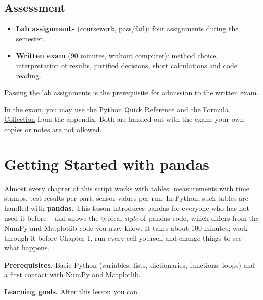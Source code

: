 \documentclass[
  letterpaper,
  DIV=11,
  numbers=noendperiod]{scrreprt}
\providecommand{\tightlist}{%
  \setlength{\itemsep}{0pt}\setlength{\parskip}{0pt}}\usepackage{longtable,booktabs,array}
\begin{document}
\section*{Assessment}\label{assessment}


\begin{itemize}
\tightlist
\item
  \textbf{Lab assignments} (coursework, pass/fail): four assignments
  during the semester.
\item
  \textbf{Written exam} (90 minutes, without computer): method choice,
  interpretation of results, justified decisions, short calculations and
  code reading.
\end{itemize}

Passing the lab assignments is the prerequisite for admission to the
written exam.

In the exam, you may use the \href{python-reference.qmd}{Python Quick
Reference} and the \href{formulas.qmd}{Formula Collection} from the
appendix. Both are handed out with the exam; your own copies or notes
are not allowed.


\chapter*{Getting Started with
pandas}\label{getting-started-with-pandas}


Almost every chapter of this script works with tables: measurements with
time stamps, test results per part, sensor values per run. In Python,
such tables are handled with \textbf{pandas}. This lesson introduces
pandas for everyone who has not used it before -- and shows the typical
\emph{style} of pandas code, which differs from the NumPy and Matplotlib
code you may know. It takes about 100 minutes; work through it before
Chapter 1, run every cell yourself and change things to see what
happens.

\textbf{Prerequisites.} Basic Python (variables, lists, dictionaries,
functions, loops) and a first contact with NumPy and Matplotlib.

\textbf{Learning goals.} After this lesson you can
\end{document}
